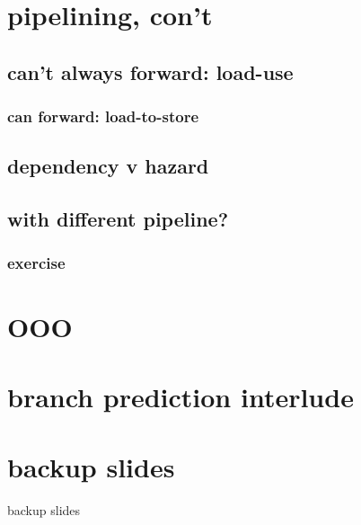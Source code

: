 \date{}
\title{}
\date{}

\begin{frame}
    \titlepage
\end{frame}

\section{pipelining, con't}

\subsection{can't always forward: load-use}


\subsubsection{can forward: load-to-store}






\subsection{dependency v hazard}




\subsection{with different pipeline?}


\subsubsection{exercise}


\section{OOO}


\section{branch prediction interlude}


\section{backup slides}
\begin{frame}{backup slides}
\end{frame}





